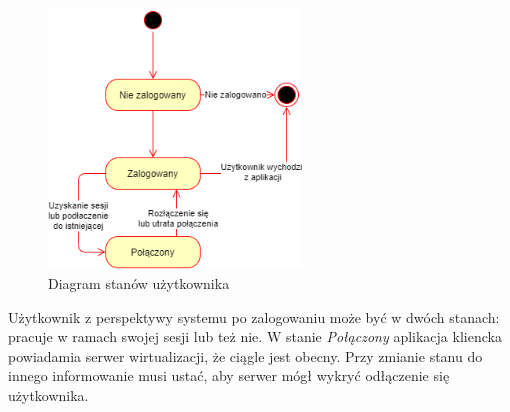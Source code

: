 \documentclass[../opis-rozwiazania.tex]{subfiles}
\begin{document}
\begin{figure}[H]
  \centering
  \includegraphics[width=0.6\textwidth]{../diagrams/state_diagrams/client.png}
  \caption{Diagram stanów użytkownika}
  \label{state_user}
\end{figure}

Użytkownik z perspektywy systemu po zalogowaniu może być w dwóch stanach: pracuje w ramach swojej sesji lub też nie.
W stanie \textit{Połączony} aplikacja kliencka powiadamia serwer wirtualizacji, że ciągle jest obecny.
Przy zmianie stanu do innego informowanie musi ustać, aby serwer mógł wykryć odłączenie się użytkownika.
\end{document}
